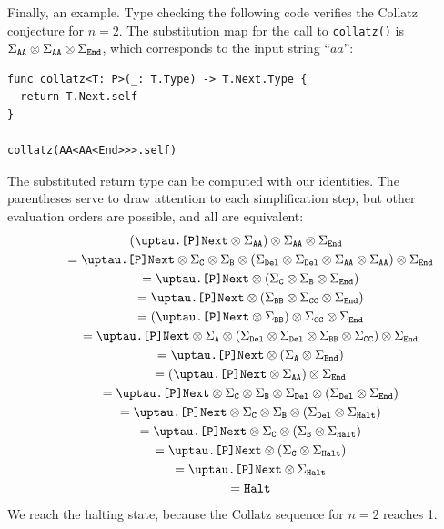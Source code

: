 \documentclass[../generics]{subfiles}
\begin{document}
Finally, an example. Type checking the following code verifies the Collatz conjecture for $n=2$. The substitution map for the call to \texttt{collatz()} is $\Sigma_{\texttt{AA}}\otimes\Sigma_{\texttt{AA}}\otimes\Sigma_{\texttt{End}}$, which corresponds to the input string ``$aa$'':
\begin{Verbatim}
func collatz<T: P>(_: T.Type) -> T.Next.Type {
  return T.Next.self
}

collatz(AA<AA<End>>>.self)
\end{Verbatim}
The substituted return type can be computed with our identities. The parentheses serve to draw attention to each simplification step, but other evaluation orders are possible, and all are equivalent:
\begin{gather*}
\left(\TNext\otimes\SigmaAA\right)\otimes\SigmaAA\otimes\SigmaEnd\\
\qquad {} = \TNext \otimes \SigmaC \otimes \SigmaB \otimes \left(\SigmaDel \otimes \SigmaDel \otimes \SigmaAA\otimes\SigmaAA\right)\otimes\SigmaEnd\\
\qquad {} = \TNext \otimes \left(\SigmaC \otimes \SigmaB \otimes\SigmaEnd\right)\\
\qquad {} = \TNext \otimes \left(\SigmaBB \otimes \SigmaCC \otimes\SigmaEnd\right)\\
\qquad {} = \left(\TNext\otimes\SigmaBB\right)\otimes\SigmaCC\otimes\SigmaEnd\\
\qquad {} = \TNext\otimes\SigmaA \otimes \left(\SigmaDel \otimes \SigmaDel \otimes \SigmaBB\otimes\SigmaCC\right)\otimes\SigmaEnd\\
\qquad {} = \TNext\otimes\left(\SigmaA \otimes \SigmaEnd\right)\\
\qquad {} = \left(\TNext\otimes\SigmaAA\right) \otimes \SigmaEnd\\
\qquad {} = \TNext \otimes \SigmaC \otimes \SigmaB \otimes \SigmaDel \otimes \left( \SigmaDel \otimes \SigmaEnd\right)\\
\qquad {} = \TNext \otimes \SigmaC \otimes \SigmaB \otimes \left(\SigmaDel \otimes \SigmaHalt\right)\\
\qquad {} = \TNext \otimes \SigmaC \otimes \left(\SigmaB \otimes \SigmaHalt\right)\\
\qquad {} = \TNext \otimes \left(\SigmaC \otimes \SigmaHalt\right)\\
\qquad {} = \TNext \otimes \SigmaHalt\\
\qquad {} = \texttt{Halt}
\end{gather*}
We reach the halting state, because the Collatz sequence for $n=2$ reaches 1.
\end{document}
